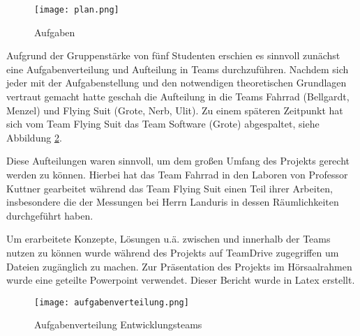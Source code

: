 \begin{figure}[h]
    \begin{center}
        \texttt{[image: plan.png]}
        \caption[Aufgaben (Abbildungsverzeichnis)]{Aufgaben
        }
        \label{fig:plan}
    \end{center}
\end{figure}


Aufgrund der Gruppenstärke von fünf Studenten erschien es sinnvoll zunächst eine Aufgabenverteilung und Aufteilung in Teams durchzuführen.
Nachdem sich jeder mit der Aufgabenstellung und den notwendigen theoretischen Grundlagen vertraut gemacht hatte geschah die Aufteilung in die Teams Fahrrad (Bellgardt, Menzel) und Flying Suit (Grote, Nerb, Ulit).
Zu einem späteren Zeitpunkt hat sich vom Team Flying Suit das Team Software (Grote) abgespaltet, siehe Abbildung \ref{fig:aufgabenverteilung}.

Diese Aufteilungen waren sinnvoll, um dem großen Umfang des Projekts gerecht werden zu können. Hierbei hat das Team Fahrrad in den Laboren von Professor Kuttner gearbeitet während das Team Flying Suit einen Teil ihrer Arbeiten, insbesondere die der Messungen bei Herrn Landuris in dessen Räumlichkeiten durchgeführt haben.

Um erarbeitete Konzepte, Lösungen u.ä. zwischen und innerhalb der Teams nutzen zu können wurde während des Projekts auf TeamDrive zugegriffen um Dateien zugänglich zu machen.
Zur Präsentation des Projekts im Hörsaalrahmen wurde eine geteilte Powerpoint verwendet. Dieser Bericht wurde in Latex erstellt.

\begin{figure}[h]
    \begin{center}
        \texttt{[image: aufgabenverteilung.png]}
        \caption[Aufgabenverteilung Entwicklungsteams (Abbildungsverzeichnis)]{Aufgabenverteilung Entwicklungsteams
        }
        \label{fig:aufgabenverteilung}
    \end{center}
\end{figure}